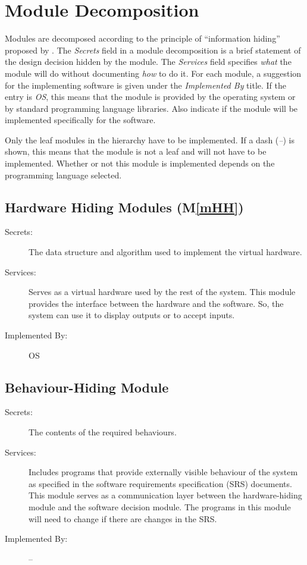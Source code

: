 \documentclass[12pt, titlepage]{article}
\newcommand{\mref}[1]{M\ref{#1}}
\begin{document}
\section{Module Decomposition} \label{SecMD}

Modules are decomposed according to the principle of ``information hiding''
proposed by \citet{ParnasEtAl1984}. The \emph{Secrets} field in a module
decomposition is a brief statement of the design decision hidden by the
module. The \emph{Services} field specifies \emph{what} the module will do
without documenting \emph{how} to do it. For each module, a suggestion for the
implementing software is given under the \emph{Implemented By} title. If the
entry is \emph{OS}, this means that the module is provided by the operating
system or by standard programming language libraries.  Also indicate if the
module will be implemented specifically for the software.

Only the leaf modules in the
hierarchy have to be implemented. If a dash (\emph{--}) is shown, this means
that the module is not a leaf and will not have to be implemented. Whether or
not this module is implemented depends on the programming language
selected.

\subsection{Hardware Hiding Modules (\mref{mHH})}

\begin{description}
\item[Secrets:]The data structure and algorithm used to implement the virtual
  hardware.
\item[Services:]Serves as a virtual hardware used by the rest of the
  system. This module provides the interface between the hardware and the
  software. So, the system can use it to display outputs or to accept inputs.
\item[Implemented By:] OS
\end{description}

\subsection{Behaviour-Hiding Module}

\begin{description}
\item[Secrets:]The contents of the required behaviours.
\item[Services:]Includes programs that provide externally visible behaviour of
  the system as specified in the software requirements specification (SRS)
  documents. This module serves as a communication layer between the
  hardware-hiding module and the software decision module. The programs in this
  module will need to change if there are changes in the SRS.
\item[Implemented By:] --
\end{description}
\end{document}
